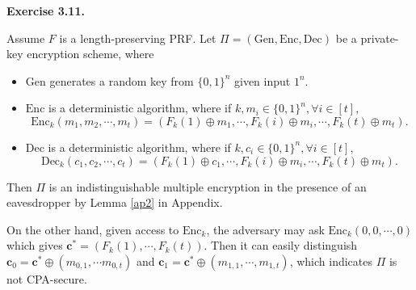 \documentclass[a4paper]{article}
\newenvironment{exercise}[1]{
	\par
	\noindent\textbf{Exercise #1.}\quad
}{
	\par
	\bigskip
}
\newcommand{\bin}{\{0,1\}}
\newcommand{\Enc}{\mathrm{Enc}}
\newcommand{\Gen}{\mathrm{Gen}}
\newcommand{\Dec}{\mathrm{Dec}}
\begin{document}
\begin{exercise}{3.11}
    Assume $F$ is a length-preserving PRF.
    Let $\Pi=(\Gen,\Enc,\Dec)$ be a private-key encryption scheme, where
    \begin{itemize}
        \item $\Gen$ generates a random key from $\bin^n$ given input $1^n$.
        \item $\Enc$ is a deterministic algorithm, where if $k,m_i\in\bin^{n},\forall i\in[t]$,
            $$
            \Enc_k(m_1,m_2,\cdots,m_t)=(F_k(1)\oplus m_1,\cdots,F_k(i)\oplus m_i,\cdots,F_k(t)\oplus m_t).
            $$
        \item $\Dec$ is a deterministic algorithm, where if $k,c_i\in\bin^{n},\forall i\in[t]$,
            $$
            \Dec_k(c_1,c_2,\cdots,c_t)=(F_k(1)\oplus c_1,\cdots,F_k(i)\oplus m_i,\cdots,F_k(t)\oplus m_t).
            $$
    \end{itemize}
    Then $\Pi$ is an indistinguishable multiple encryption in the presence of an eavesdropper by Lemma \ref{ap2} in Appendix.

    On the other hand, given access to $\Enc_k$, the adversary may ask $\Enc_k(0,0,\cdots,0)$ which gives
    $\bm c^*=(F_k(1),\cdots,F_k(t))$. Then it can easily distinguish $\bm c_0=\bm c^*\oplus(m_{0,1},\cdots m_{0,t})$ 
    and $\bm c_1=\bm c^*\oplus(m_{1,1},\cdots,m_{1,t})$, which indicates $\Pi$ is not CPA-secure.
\end{exercise}
\end{document}
